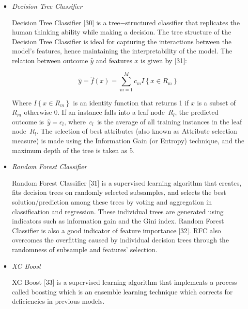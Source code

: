 \documentclass[11pt]{article}
\begin{document}
\begin{itemize}
\vspace{1\baselineskip}
	\item \textit{Decision Tree Classifier }

Decision Tree Classifier [30] is a tree$-$structured classifier that replicates the human thinking ability while making a decision. The tree structure of the Decision Tree Classifier is ideal for capturing the interactions between the model's features, hence maintaining the interpretability of the model.  The relation between outcome \(\hat{y}\) and features \( x\) is given by [31]:

\vspace{1\baselineskip}
\begin{equation}
\hat{y} =\hat{f}(x) = \sum_{m = 1}^{M} c_{m}I\left\{ x\in R_{m}\right\} 
\end{equation}


\vspace{1\baselineskip}
Where \( I\left\{ x\in R_{m}\right\}\) is an identity function that returns 1 if \( x\) is a subset of \( R_{m}\) otherwise 0. If an instance falls into a leaf node \( R_{l}\), the predicted outcome is \(\hat{y} = c_{l}\), where \( c_{l}\) is the average of all training instances in the leaf node \( R_{l}\). The selection of best attributes (also known as Attribute selection measure) is made using the Information Gain (or Entropy) technique, and the maximum depth of the tree is taken as 5.

\vspace{1\baselineskip}
	\item \textit{Random Forest Classifier}

Random Forest Classifier [31] is a supervised learning algorithm that creates, fits decision trees on randomly selected subsamples, and selects the best solution/prediction among these trees by voting and aggregation in classification and regression. These individual trees are generated using indicators such as information gain and the Gini index. Random Forest Classifier is also a good indicator of feature importance [32]. RFC also overcomes the overfitting caused by individual decision trees through the randomness of subsample and features’ selection.

\vspace{1\baselineskip}
	\item \textit{XG Boost}

XG Boost [33] is a supervised learning algorithm that implements a process called boosting which is an ensemble learning technique which corrects for deficiencies in previous models. 


\end{itemize}
\end{document}
